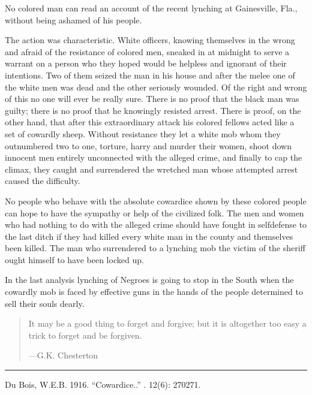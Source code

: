 \documentclass[letterpaper,10pt,english]{jupyterBook}
\begin{document}
\sphinxAtStartPar
No colored man can read an account of the recent lynching at Gainesville, Fla., without being ashamed of his people.

\sphinxAtStartPar
The action was characteristic. White officers, knowing themselves in the wrong and afraid of the resistance of colored men, sneaked in at midnight to serve a warrant on a person who they hoped would be helpless and ignorant of their intentions. Two of them seized the man in his house and after the melee one of the white men was dead and the other seriously wounded. Of the right and wrong of this no one will ever be really sure. There is no proof that the black man was guilty; there is no proof that he knowingly resisted arrest. There is proof, on the other hand, that after this extraordinary attack his colored fellows acted like a set of cowardly sheep. Without resistance they let a white mob whom they outnumbered two to one, torture, harry and murder their women, shoot down innocent men entirely unconnected with the alleged crime, and finally to cap the climax, they caught and surrendered the wretched man whose attempted arrest caused the difficulty.

\sphinxAtStartPar
No people who behave with the absolute cowardice shown by these colored people can hope to have the sympathy or help of the civilized folk. The men and women who had nothing to do with the alleged crime should have fought in self\sphinxhyphen{}defense to the last ditch if they had killed every white man in the county and themselves been killed. The man who surrendered to a lynching mob the victim of the sheriff ought himself to have been locked up.

\sphinxAtStartPar
In the last analysis lynching of Negroes is going to stop in the South when the cowardly mob is faced by effective guns in the hands of the people determined to sell their souls dearly.
\begin{quote}

\sphinxAtStartPar
It may be a good thing to forget and forgive; but it is altogether too easy a trick to forget and be forgiven.

\begin{flushright}
---G.K. Chesterton
\end{flushright}
\end{quote}


\bigskip\hrule\bigskip


\sphinxAtStartPar
{} Du Bois, W.E.B. 1916. “Cowardice..” . 12(6): 270\sphinxhyphen{}271.
\end{document}

